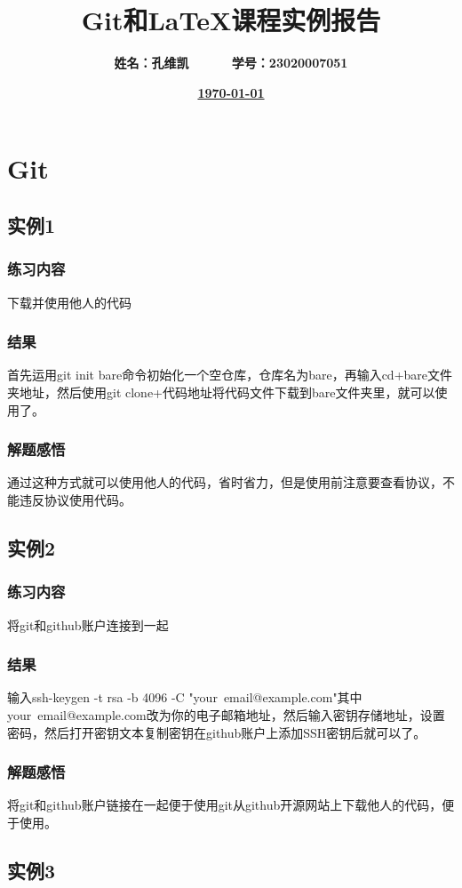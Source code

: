 \documentclass{ctexart}
\title{\textbf{Git和LaTeX课程实例报告}}
\author{\textbf{姓名：孔维凯\ \ \ \ \ \ 学号：23020007051}}
\date{\underline{\textbf{\today}}}
\begin{document}
\maketitle

\newpage

\tableofcontents

\newpage

\section{Git}
\subsection{实例1}
\subsubsection{练习内容}
下载并使用他人的代码
\subsubsection{结果}
首先运用git init bare命令初始化一个空仓库，仓库名为bare，再输入cd+bare文件夹地址，然后使用git clone+代码地址将代码文件下载到bare文件夹里，就可以使用了。
\subsubsection{解题感悟}
通过这种方式就可以使用他人的代码，省时省力，但是使用前注意要查看协议，不能违反协议使用代码。
\subsection{实例2}
\subsubsection{练习内容}
将git和github账户连接到一起
\subsubsection{结果}
输入ssh-keygen -t rsa -b 4096 -C "your\ email@example.com"其中your\ email@example.com改为你的电子邮箱地址，然后输入密钥存储地址，设置密码，然后打开密钥文本复制密钥在github账户上添加SSH密钥后就可以了。
\subsubsection{解题感悟}
将git和github账户链接在一起便于使用git从github开源网站上下载他人的代码，便于使用。
\subsection{实例3}
\end{document}
